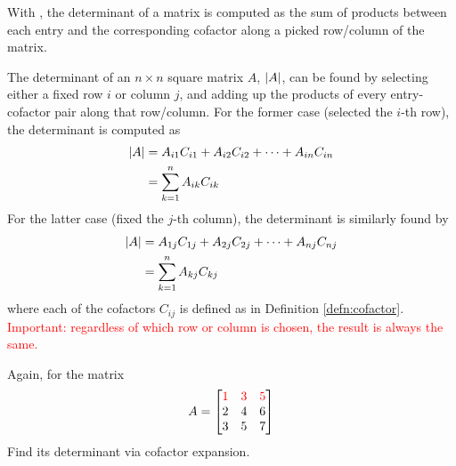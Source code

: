 With , the determinant of a matrix is computed as the sum of products between each entry and the corresponding cofactor along a picked row/column of the matrix.
\begin{proper}
\label{proper:cofactorex}
The determinant of an $n \times n$ square matrix $A$, $\abs{A}$, can be found by selecting either a fixed row $i$ or column $j$, and adding up the products of every entry-cofactor pair along that row/column. For the former case (selected the $i$-th row), the determinant is computed as
\begin{subequations}
\label{eqn:cofactorexrow}
\begin{align}
\abs{A} &= A_{i1}C_{i1} + A_{i2}C_{i2} + \cdots + A_{in}C_{in} \\
&= \sum_{k=1}^{n} A_{ik}C_{ik}
\end{align}    
\end{subequations}
For the latter case (fixed the $j$-th column), the determinant is similarly found by
\begin{subequations}
\begin{align}
\abs{A} &= A_{1j}C_{1j} + A_{2j}C_{2j} + \cdots + A_{nj}C_{nj} \\
&= \sum_{k=1}^{n} A_{kj}C_{kj}
\end{align}
\end{subequations}
where each of the cofactors $C_{ij}$ is defined as in Definition \ref{defn:cofactor}. \textcolor{red}{Important: regardless of which row or column is chosen, the result is always the same.\footnotemark}
\end{proper}
\begin{exmp}
Again, for the matrix
\begin{align*}
A =
\begin{bmatrix}
\mathcolor{red}{1} & \mathcolor{red}{3} & \mathcolor{red}{5} \\
2 & 4 & 6 \\
3 & 5 & 7 
\end{bmatrix}   
\end{align*}
Find its determinant via cofactor expansion.
\end{exmp}
